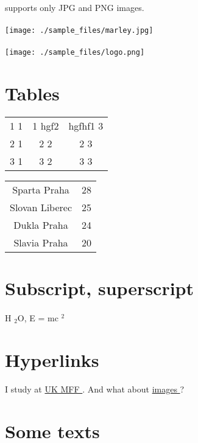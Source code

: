 \documentclass{article}
\begin{document}
\paragraph{} supports only JPG and PNG images. \paragraph{}\begin{center}\texttt{[image: ./sample\_files/marley.jpg]}\end{center}\paragraph{}\paragraph{}\texttt{[image: ./sample\_files/logo.png]}\section*{Tables }
\begin{tabular}{|c|c|c|}\hline
1 1  & 1 hgf2  & hgfhf1 3 \\
2 1  & 2 2  & 2 3 \\
3 1  & 3 2  & 3 3 \\\hline\end{tabular}\newline\newline\begin{tabular}{|c|c|}\hline
Sparta Praha  & 28 \\
Slovan Liberec  & 25 \\
Dukla Praha  & 24 \\
Slavia Praha  & 20 \\\hline\end{tabular}\newline\section*{Subscript, superscript }
\paragraph{}H $_{2 }$O, E = mc $^{2 }$\section*{Hyperlinks }
\paragraph{}I study at  \href{http://www.mff.cuni.cz/}{UK MFF }. And    what about  \href{http://www.cse.iitd.ac.in/~shubhankar/TA/COP701/sample1.html#img}{images }? \section*{Some texts }
\end{document}
